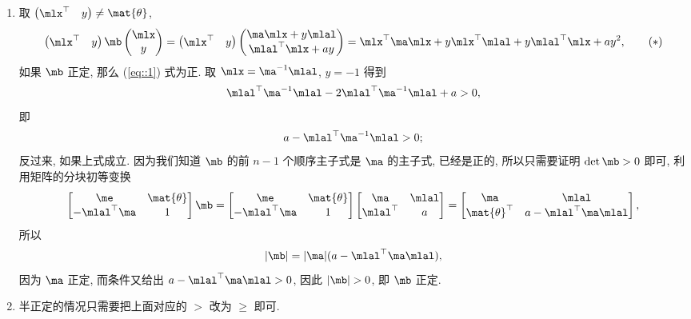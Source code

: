 \begin{solution}
    \begin{enumerate}
        \item 取 $\begin{pmatrix} \mlx^\top & y \end{pmatrix} \not= \mat{\theta}$,
        \[\label{eq::1}
        \begin{pmatrix}
            \mlx^\top & y
        \end{pmatrix} \mb
        \begin{pmatrix}
            \mlx \\ y
        \end{pmatrix} = 
        \begin{pmatrix}
            \mlx^\top & y
        \end{pmatrix}
        \begin{pmatrix}
            \ma \mlx + y \mlal \\
            \mlal^\top \mlx + ay
        \end{pmatrix} = 
        \mlx^\top \ma \mlx + y \mlx^\top \mlal + y\mlal^\top \mlx + ay^2, \tag{$\ast$}
        \]
        如果 $\mb$ 正定, 那么 (\ref{eq::1}) 式为正. 取 $\mlx = \ma^{-1}\mlal$, $y = -1$ 得到
        \[
        \mlal^\top \ma^{-1} \mlal - 2 \mlal^\top \ma^{-1} \mlal + a > 0,
        \]
        即
        \[
            a - \mlal^\top \ma^{-1} \mlal > 0;
        \]
        反过来, 如果上式成立. 因为我们知道 $\mb$ 的前 $n - 1$ 个顺序主子式是 $\ma$ 的主子式, 已经是正的, 所以只需要证明 $\det \mb > 0$ 即可, 利用矩阵的分块初等变换
        \[
        \left[
            \begin{matrix}
                \me & \mat{\theta} \\
                -\mlal^\top \ma & 1
            \end{matrix}
        \right]\mb = \left[
            \begin{matrix}
                \me & \mat{\theta} \\
                -\mlal^\top \ma & 1
            \end{matrix}
        \right]
        \left[
            \begin{matrix}
                \ma & \mlal \\
                \mlal^\top & a
            \end{matrix}
        \right] =
        \left[
            \begin{matrix}
                \ma & \mlal \\
                \mat{\theta}^\top & a-\mlal^\top \ma \mlal
            \end{matrix}
        \right],
        \]
        所以
        \[
        |\mb| = |\ma|(a - \mlal^\top \ma \mlal),
        \]
        因为 $\ma$ 正定, 而条件又给出 $a - \mlal^\top \ma \mlal > 0$, 因此 $|\mb| > 0$, 即 $\mb$ 正定.
        \item 半正定的情况只需要把上面对应的 $>$ 改为 $\geqslant$ 即可.
    \end{enumerate}
\end{solution}

